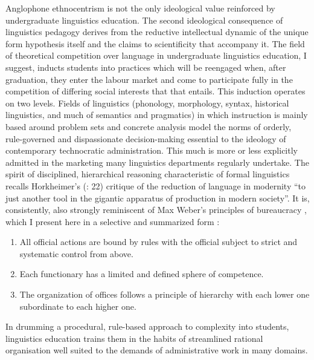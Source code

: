 \documentclass[output=paper]{langscibook}
\begin{document}
Anglophone ethnocentrism is not the only ideological value reinforced by undergraduate linguistics education. The second ideological consequence of linguistics pedagogy derives from the reductive intellectual dynamic of the unique form hypothesis itself and the claims to scientificity that accompany it. The field of theoretical competition over language in undergraduate linguistics education, I suggest, inducts students into practices which will be reengaged when, after graduation, they enter the labour market and come to participate fully in the competition of differing social interests that that entails. This induction operates on two levels. Fields of linguistics (phonology, morphology, syntax, historical linguistics, and much of semantics and pragmatics) in which instruction is mainly based around problem sets and concrete analysis model the norms of orderly, rule-governed and dispassionate decision-making essential to the ideology of contemporary technocratic administration. This much is more or less explicitly admitted in the marketing many linguistics departments regularly undertake. The spirit of disciplined, hierarchical reasoning characteristic of formal linguistics recalls Horkheimer's (\citeyear{Horkheimer19921947}: 22) critique of the reduction of language in modernity ``to just another tool in the gigantic apparatus of production in modern society''. It is, consistently, also strongly reminiscent of Max Weber's principles of bureaucracy \citep[329--341]{Weber1947}, which I present here in a selective and summarized form \citep[177--178]{Blackburn1967}:

\begin{enumerate}
    \item All official actions are bound by rules with the official subject to strict and systematic control from above.
    \item Each functionary has a limited and defined sphere of competence.
    \item The organization of offices follows a principle of hierarchy with each lower one subordinate to each higher one.
\end{enumerate}

\noindent In drumming a procedural, rule-based approach to complexity into students, linguistics education trains them in the habits of streamlined rational organisation well suited to the demands of administrative work in many domains.
\end{document}
